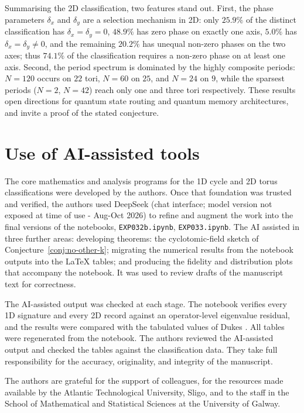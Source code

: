 \documentclass[aps,pra,reprint,amsmath,amssymb,superscriptaddress,floatfix]{revtex4-2}
\begin{document}
Summarising the 2D classification, two features stand out.
First, the phase parameters $\delta_x$ and $\delta_y$ are a
selection mechanism in 2D: only $25.9\%$ of the distinct
classification has $\delta_x = \delta_y = 0$, $48.9\%$ has
zero phase on exactly one axis, $5.0\%$ has
$\delta_x = \delta_y \neq 0$, and the remaining $20.2\%$ has
unequal non-zero phases on the two axes; thus $74.1\%$ of the
classification requires a non-zero phase on at least one axis.
Second, the period
spectrum is dominated by the highly composite periods: $N = 120$
occurs on $22$ tori, $N = 60$ on $25$, and $N = 24$ on $9$,
while the sparsest periods ($N = 2$, $N = 42$) reach only one
and three tori respectively. These results open directions for
quantum state routing and quantum memory architectures, and
invite a proof of the stated conjecture.
\par
\par\section*{Use of AI-assisted tools}
\label{sec:ai-disclosure}
The core mathematics and analysis programs for the 1D cycle and 2D
torus classifications were developed by the authors. Once that
foundation was trusted and verified, the authors used DeepSeek (chat interface;
model version not exposed at time of use - Aug-Oct 2026) to refine and 
augment the work into the final versions  of the  notebooks, \texttt{EXP032b.ipynb}, 
\texttt{EXP033.ipynb}. 
The AI assisted in three further areas: developing theorems: the cyclotomic-field
sketch of Conjecture~\ref{conj:no-other-k}; migrating the numerical
results from the notebook outputs into the LaTeX tables; and producing the 
fidelity and distribution plots that accompany the notebook. 
It was used to review drafts of the manuscript text for correctness.

The AI-assisted output was checked at each stage. The notebook
verifies every 1D signature and every 2D record against an
operator-level eigenvalue residual, and the results were compared
with the tabulated values of Dukes \cite{Dukes2014}. All tables were
regenerated from the notebook. The authors reviewed the AI-assisted output
and checked the tables against the classification data.
They take full responsibility for the accuracy,
originality, and integrity of the manuscript.
\par
\begin{acknowledgments}
The authors are grateful for the support of colleagues, for the resources made available by the Atlantic Technological University, Sligo, and to the staff in the School of Mathematical and Statistical Sciences at the University of Galway.
\end{acknowledgments}
\end{document}
